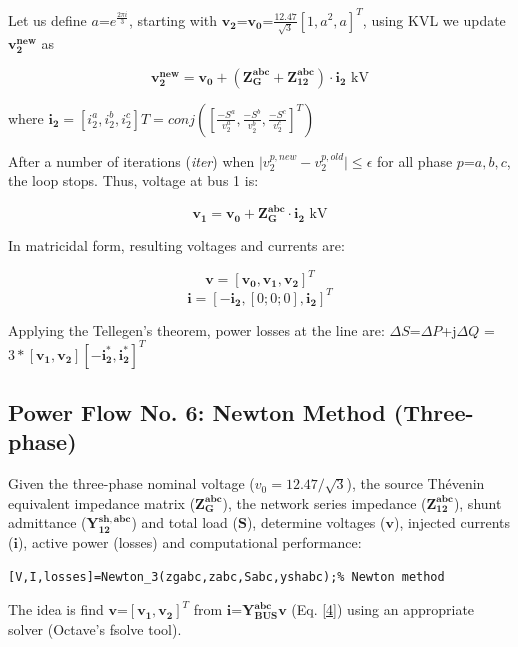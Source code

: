 \documentclass[12pt]{article}
\begin{document}
Let us define $a$=$e^{\frac{2 \pi i}{3}}$, starting with $\bm{v_2}$=$\bm{v_0}$=$\frac{12.47}{\sqrt{3}}[1, a^2, a]^T$, using KVL we update $\bm{v^{new}_2}$ as

\begin{equation}
  \bm{v^{new}_2}=\bm{v_0}+(\mathbf{{Z}^{abc}_{G}}+\mathbf{{Z}^{abc}_{12}})\cdot \bm{i_2}\mbox{ kV}
\end{equation}


where $\bm{i_2}=[i^a_2, i^b_2,i^c_2]T=conj([\frac{-{S^a}}{{v}^a_2},\frac{-{S^b}}{{v}^b_2},\frac{-{S^c}}{{v}^c_2}]^T)$

After a number of iterations (\textit{iter}) when $\mid{v}^{p,new}_2-{v}^{p, old}_2\mid\leq \epsilon$ for all phase $p$=$a,b,c$, the loop stops. Thus, voltage at bus 1 is:

\begin{equation}
  \bm{v_1}=\bm{v_0}+\mathbf{{Z}^{abc}_{G}}\cdot \bm{i_2}\mbox{ kV}
\end{equation}

In matricidal form, resulting voltages and currents are:

\begin{equation}
  \bm{v}=[\bm{v_0}, \bm{v_1},\bm{v_2}]^T
\end{equation}
\begin{equation}
  \bm{i}=[-\bm{i_2},[0;0;0],\bm{i_2}]^T
\end{equation}

Applying the Tellegen's theorem, power losses at the line are: $\Delta {S}$=$\Delta P$+j$\Delta Q$ 
=$3*[\bm{v_1},\bm{v_2}][-\bm{i^*_2},\bm{i^*_2}]^T$

\subsection{Power Flow No. 6: Newton Method (Three-phase)}

Given the three-phase nominal voltage ($v_0=12.47/\sqrt{3}$), the source Th\'evenin equivalent impedance matrix ($\mathbf{{Z}^{abc}_{G}}$), the network series impedance ($\mathbf{{Z}^{abc}_{12}}$), shunt admittance ($\mathbf{{Y}^{sh,abc}_{12}}$) and total load ($\bm{S}$),
determine voltages ($\bm{v}$), injected currents ($\mathbf{i}$), active power (losses) and computational performance:
    
\begin{verbatim}
[V,I,losses]=Newton_3(zgabc,zabc,Sabc,yshabc);% Newton method
\end{verbatim}

The idea is find $\bm{v}$=$[\bm{v_1},\bm{v_2}]^T$ from $\bm{i}$=$\mathbf{Y^{abc}_{BUS}}\bm{v}$ (Eq. \ref{4}) using an appropriate solver (Octave's {fsolve} tool).
\end{document}
